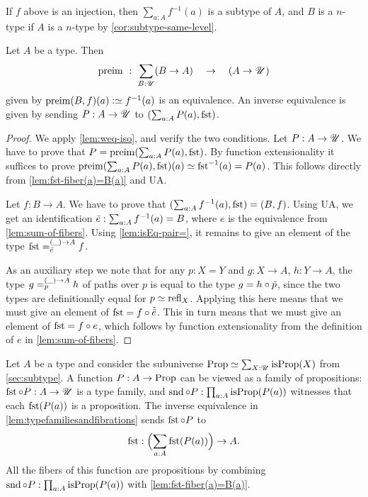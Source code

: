 If $f$ above is an injection, then $\sum_{a:A} f^{-1}(a)$ is a subtype of $A$,
and $B$ is a $n$-type if $A$ is a $n$-type by \cref{cor:subtype-same-level}.

\begin{lemma}\label{lem:typefamiliesandfibrations}
Let $A$ be a type. Then
\[
\preim ~:~ \sum_{B:\UU}(B\to A) \quad\to\quad (A\to\UU)
\]
given by $\preim(B,f)(a)\defeq f^{-1}(a)$ is an equivalence.
An inverse equivalence is given by sending $P:A\to{\mathscr{U}}$ to
$(\sum_{a:A}P(a), \fst)$.
\end{lemma}

\begin{proof}
We apply \cref{lem:weq-iso}, and verify the two conditions.
Let $P:A\to{\mathscr{U}}$. We have to prove that $P = \preim(\sum_{a:A}P(a), \fst)$.
By function extensionality it suffices to prove
$\preim(\sum_{a:A}P(a), \fst)(a)\jdeq \fst^{-1}(a) = P(a)$.
This follows directly from \cref{lem:fst-fiber(a)=B(a)} and UA.

Let $f: B\to A$. We have to prove that $(\sum_{a:A} f^{-1}(a), \fst)=(B,f)$.
Using UA, we get an identification
$\bar {e} : \sum_{a:A} f^{-1}(a) = B$, where $e$ is the equivalence
from \cref{lem:sum-of-fibers}. Using \cref{lem:isEq-pair=},
it remains to give an element of the type $\pathover{\fst}{(\_)\to A}{\etop{e}}{f}$.

As an auxiliary step we note that for any $p: X=Y$ and $g:X\to A$,
$h:Y\to A$, the type $\pathover{g}{(\_)\to A}{p}{h}$ of paths over $p$
is equal to the type $g = h\circ{\tilde {p}}$, since the two
types are definitionally equal for $p\jdeq\refl{X}$.
Applying this here means that we must give an element of
$\fst = f\circ{\ptoe{\etop{e}}}$. This in turn means that
we must give an element of $\fst = f\circ e$,
which follows by function extensionality from the definition
of $e$ in \cref{lem:sum-of-fibers}.
\end{proof}

Let $A$ be a type and consider the subuniverse
$\Prop\jdeq \sum_{X:\UU}\isprop(X)$ from \cref{sec:subtype}.
A function $P: A\to\mathrm{Prop}$ can be viewed as a family of propositions:
$\fst\circ P : A\to \UU$ is a type family, and
$\snd\circ P : \prod_{a:A} \isprop(P(a))$ witnesses
that each $\fst(P(a))$ is a proposition.
The inverse equivalence in \cref{lem:typefamiliesandfibrations}
sends $\fst\circ P$ to
\[
  \fst: \Bigl(\sum_{a:A} \fst(P(a))\Bigr) \to A.
\]
All the fibers of this function are propositions by combining
$\snd\circ P : \prod_{a:A} \isprop(P(a))$
with \cref{lem:fst-fiber(a)=B(a)}.

